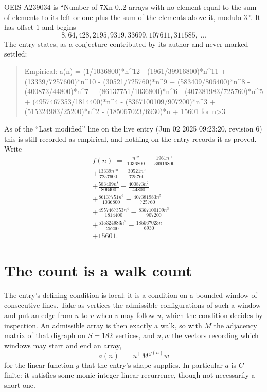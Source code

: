 \documentclass[11pt,a4paper]{article}
\theoremstyle{plain}
\theoremstyle{definition}
\begin{document}
OEIS A239034 is ``Number of 7Xn 0..2 arrays with no element equal to the sum of elements to its left or one plus the sum of the elements above it, modulo 3.''. It has offset $1$ and begins
\[
8, 64, 428, 2195, 9319, 33699, 107611, 311585,\ \dots
\]
The entry states, as a conjecture contributed by its author and never marked settled:
\begin{quote}
Empirical: a(n) = (1/1036800)*n\^{}12 - (1961/39916800)*n\^{}11 + (13339/7257600)*n\^{}10 - (30521/725760)*n\^{}9 + (583409/806400)*n\^{}8 - (400873/44800)*n\^{}7 + (86137751/1036800)*n\^{}6 - (407381983/725760)*n\^{}5 + (4957467353/1814400)*n\^{}4 - (8367100109/907200)*n\^{}3 + (515324983/25200)*n\^{}2 - (185067023/6930)*n + 15601 for n>3
\end{quote}
As of the ``Last modified'' line on the live entry (Jun 02 2025 09:23:20, revision 6) this is still
recorded as empirical, and nothing on the entry records it as proved. Write
\begin{multline*}
f(n)\;=\;\frac{n^{12}}{1036800} - \frac{1961 n^{11}}{39916800} \\
+ \frac{13339 n^{10}}{7257600} - \frac{30521 n^{9}}{725760} \\
+ \frac{583409 n^{8}}{806400} - \frac{400873 n^{7}}{44800} \\
+ \frac{86137751 n^{6}}{1036800} - \frac{407381983 n^{5}}{725760} \\
+ \frac{4957467353 n^{4}}{1814400} - \frac{8367100109 n^{3}}{907200} \\
+ \frac{515324983 n^{2}}{25200} - \frac{185067023 n}{6930} \\
+ 15601.
\end{multline*}

\section{The count is a walk count}

The entry's defining condition is local: it is a condition on a bounded window of consecutive lines. Take as vertices the
admissible configurations of such a window and put an edge from $u$ to $v$ when $v$ may
follow $u$, which the condition decides by inspection. An admissible array is then exactly a
walk, so with $M$ the adjacency matrix of that digraph on $S=182$ vertices, and $u,w$ the
vectors recording which windows may start and end an array,
\[
a(n)\;=\;u^{\!\top}M^{\,g(n)}w
\]
for the linear function $g$ that the entry's shape supplies. In particular $a$ is
$C$-finite: it satisfies some monic integer linear recurrence, though not necessarily a short
one.
\end{document}
